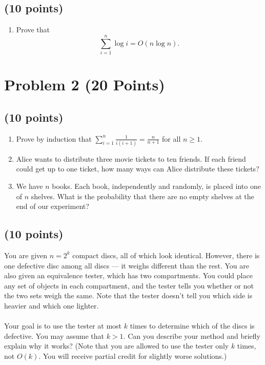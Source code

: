 \documentclass[letterpaper, 11pt]{article}
\begin{document}
\subsection{(10 points)}

\begin{enumerate}

\item Prove that $$\sum_{i=1}^n {\log i} = O(n \log n).$$

\end{enumerate}

\section{Problem 2 (20 Points)}

\subsection{(10 points)}

\begin{enumerate}
\item Prove by induction that $\sum_{i=1}^n \frac{1}{i(i+1)} = \frac{n}{n+1}$ for all $n\ge 1$.

\item Alice wants to distribute three movie tickets to ten friends. If each friend could get up to one ticket, how many ways can Alice distribute these tickets?

\item We have $n$ books. Each book, independently and randomly, is placed into one of $n$ shelves. What is the probability that there are no empty shelves at the end of our experiment?
\end{enumerate}

\subsection{(10 points)}

You are given $n=2^k$ compact discs, all of which look identical. However, there is one defective disc among all discs --- it weighs different than the rest. You are also given an equivalence tester, which has two compartments. You could place any set of objects in each compartment, and the
tester tells you whether or not the two sets weigh the same. Note that the tester doesn't tell you which side is heavier and which one lighter. \\\\
Your goal is to use the tester at most $k$ times to determine which of the discs is defective. You may assume that $k > 1$. Can you describe your method and briefly explain why it works? (Note that you are allowed to use the tester only $k$ times, not $O(k)$. You will receive partial credit for slightly worse solutions.)
\end{document}
